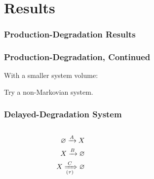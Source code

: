 \documentclass[xcolor={usenames,dvipsnames,svgnames}]{beamer}
\begin{document}

\section{Results}

\begin{frame}
    \frametitle{Production-Degradation Results}
    \begin{center}
        \resizebox{0.48\textwidth}{!}{
            
        }
        \resizebox{0.48\textwidth}{!}{
            
        }
    \end{center}
\end{frame}

\begin{frame}
    \frametitle{Production-Degradation, Continued}
    With a smaller system volume:

    \begin{center}
        \resizebox{0.48\textwidth}{!}{
            
        }
        \resizebox{0.48\textwidth}{!}{
            
        }
    \end{center}

    \pause
    Try a non-Markovian system.
\end{frame}

\begin{frame}
    \frametitle{Delayed-Degradation System}
    \begin{columns}[c]
        \begin{column}{0.5\textwidth}
            \begin{align*}
                \varnothing \xrightarrow{A} X \\
                X \xrightarrow{B} \varnothing \\
                X \xRightarrow[(\tau)]{C} \varnothing
            \end{align*}
        \end{column}
        \begin{column}{0.5\textwidth}
            \begin{center}
                \resizebox{\textwidth}{!}{
                    
                }
            \end{center}
        \end{column}
    \end{columns}
\end{frame}
\end{document}
